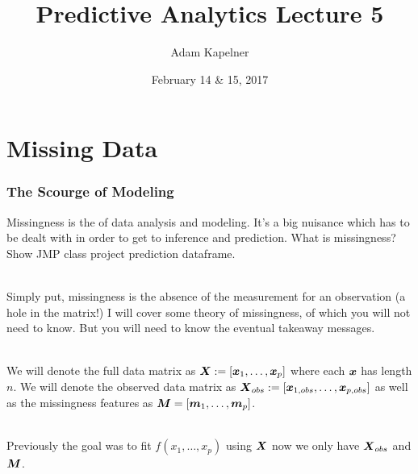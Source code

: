 \documentclass[handout]{beamer}
\title[Lecture]{Predictive Analytics Lecture 5}
\institute[Wharton, Statistics]{Stat 422/722\\ at The Wharton School of the University of Pennsylvania}
\date{February 14 \& 15, 2017}
\author{Adam Kapelner}
\begin{document}
\frame{\titlepage}

\section{Missing Data}


\begin{frame}\frametitle{The Scourge of Modeling}
\small
Missingness is the  of data analysis and modeling. It's a big nuisance which has to be dealt with in order to get to inference and prediction. What is missingness? \pause Show JMP class project prediction dataframe. \\~\\ \pause

Simply put, missingness is the absence of the measurement for an observation (a hole in the matrix!) I will cover some theory of missingness, of which you will not need to know. But you will need to know the eventual takeaway messages. \\~\\ \pause

We will denote the full data matrix as $\boldsymbol{X} := \left[\boldsymbol{x}_1, \ldots, \boldsymbol{x}_p\right]$ where each $\boldsymbol{x}$ has length $n$. We will denote the observed data matrix as $\boldsymbol{X}_{obs} := \left[\boldsymbol{x}_{1,obs}, \ldots, \boldsymbol{x}_{p,obs}\right]$ as well as the missingness features as $\boldsymbol{M} = \left[\boldsymbol{m}_1, \ldots, \boldsymbol{m}_p\right]$. \\~\\ \pause

Previously the goal was to fit $f(x_1,\ldots, x_p)$ using $\boldsymbol{X}$ now we only have $\boldsymbol{X}_{obs}$ and $\boldsymbol{M}$.

	
\end{frame}
\end{document}
